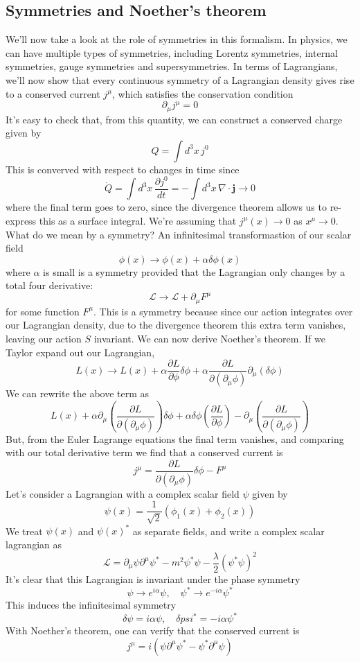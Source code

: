 \subsection{Symmetries and Noether's theorem}
We'll now take a look at the role of symmetries in this formalism. In physics, we can have multiple types of symmetries, including Lorentz symmetries, internal symmetries, gauge symmetries and supersymmetries. In terms of Lagrangians, we'll now show that every continuous symmetry of a Lagrangian density gives rise to a conserved current $j^\mu$, which satisfies the conservation condition 
\[ 
\partial_\mu j^\mu = 0 
\]
It's easy to check that, from this quantity, we can construct a conserved charge given by 
\[ 
Q = \int d^3 x \, j^0 
\] 
This is converved with respect to changes in time since 
\[ 
\dot Q = \int d^3 x \, \frac{ \partial j^0 }{ dt }  =  - \int d^3 x \, \nabla \cdot \mathbf{ j } \rightarrow 0 
\] 
where the final term goes to zero, since the divergence theorem allows us to re-express this as a surface integral. We're assuming that $j^\mu (x) \rightarrow 0 $ as $ x^\mu \rightarrow 0$. 
What do we mean by a symmetry? An infinitesimal transformastion of our scalar field 
\[ 
\phi(x) \rightarrow \phi( x)  + \alpha \delta \phi( x) 
\] 
where $\alpha $ is small is a symmetry provided that the Lagrangian only changes by a total four derivative: 
\[ 
\mathcal{L} \rightarrow \mathcal{L } + \partial_\mu F^\mu 
\] 
for some function $F^\mu$. This is a symmetry because since our action integrates over our Lagrangian density, due to the divergence theorem this extra term vanishes, leaving our action $S$ invariant. 
We can now derive Noether's theorem. If we Taylor expand out our Lagrangian, 
\[ 
L(x) \rightarrow L(x) + \alpha \frac{ \partial L }{ \partial \phi} \delta \phi + \alpha \frac{ \partial L}{ \partial ( \partial_\mu \phi ) } \partial_\mu ( \delta \phi )  
\] 
We can rewrite the above term as 
\[ 
L (x) + \alpha \partial_\mu \left( \frac{ \partial L }{ \partial ( \partial_\mu \phi ) }\right)  \delta \phi + \alpha \delta \phi \left( \frac{ \partial L }{ \partial \phi } \right)   - \partial_\mu \left( \frac{ \partial L }{ \partial ( \partial_\mu \phi ) } \right) 
\] 
But, from the Euler Lagrange equations the final term vanishes, and comparing with our total derivative term we find that a conserved current is 
\[ 
j^\mu = \frac{ \partial L }{ \partial ( \partial_\mu \phi ) } \delta \phi  - F^\mu
\] 
Let's consider a Lagrangian with a complex scalar field $\psi$ given by 
\[ 
\psi( x)  = \frac{ 1}{ \sqrt{ 2} } ( \phi_1 ( x) + \phi_2 ( x) ) 
\] 
We treat $\psi ( x)$ and $\psi ( x)^* $ as separate fields, and write a complex scalar lagrangian as 
\[ 
\mathcal{ L } = \partial_\mu \psi \partial^\mu \psi^*  - m^2 \psi^* \psi  - \frac{ \lambda}{2} ( \psi^* \psi)^2 
\] 
It's clear that this Lagrangian is invariant under the phase symmetry 
\[ 
\psi \rightarrow e^{ i \alpha} \psi, \quad \psi^* \rightarrow e^{ - i \alpha} \psi^* 
\] 
This induces the infinitesimal symmetry 
\[ 
\delta \psi = i \alpha \psi, \quad \delta psi^*  = - i \alpha \psi^* 
\] 
With Noether's theorem, one can verify that the conserved current is 
\[ 
j^\mu  = i ( \psi \partial^\mu \psi^ * - \psi^* \partial^\mu \psi )  
\] 

